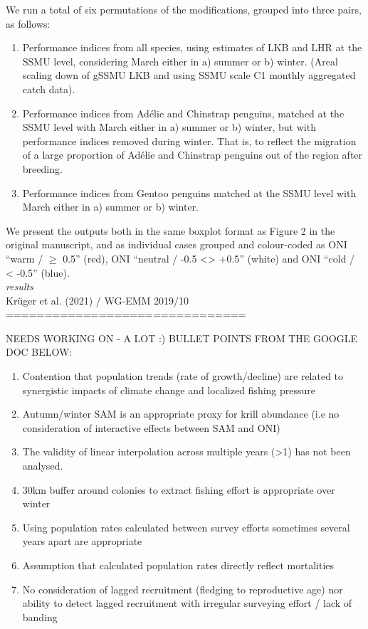 \documentclass[]{elsarticle} %
\providecommand{\tightlist}{%
  \setlength{\itemsep}{0pt}\setlength{\parskip}{0pt}}
\begin{document}
We run a total of six permutations of the modifications, grouped into
three pairs, as follows:

\begin{enumerate}
\def\labelenumi{\arabic{enumi}.}
\tightlist
\item
  Performance indices from all species, using estimates of LKB and LHR
  at the SSMU level, considering March either in a) summer or b) winter.
  (Areal scaling down of gSSMU LKB and using SSMU scale C1 monthly
  aggregated catch data).
\item
  Performance indices from Adélie and Chinstrap penguins, matched at the
  SSMU level with March either in a) summer or b) winter, but with
  performance indices removed during winter. That is, to reflect the
  migration of a large proportion of Adélie and Chinstrap penguins out
  of the region after breeding.
\item
  Performance indices from Gentoo penguins matched at the SSMU level
  with March either in a) summer or b) winter.
\end{enumerate}

We present the outputs both in the same boxplot format as Figure 2 in
the original manuscript, and as individual cases grouped and
colour-coded as ONI ``warm / \(\geqslant\) 0.5'' (red), ONI ``neutral /
-0.5 \textless\textgreater{} +0.5'' (white) and ONI ``cold / \textless{}
-0.5'' (blue).\\
\newline   \emph{results}\\
\newline Krüger et al. (2021) / WG-EMM 2019/10
===============================

NEEDS WORKING ON - A LOT :) BULLET POINTS FROM THE GOOGLE DOC BELOW:

\begin{enumerate}
\def\labelenumi{\arabic{enumi}.}
\tightlist
\item
  Contention that population trends (rate of growth/decline) are related
  to synergistic impacts of climate change and localized fishing
  pressure
\item
  Autumn/winter SAM is an appropriate proxy for krill abundance (i.e no
  consideration of interactive effects between SAM and ONI)
\item
  The validity of linear interpolation across multiple years
  (\textgreater1) has not been analysed.
\item
  30km buffer around colonies to extract fishing effort is appropriate
  over winter
\item
  Using population rates calculated between survey efforts sometimes
  several years apart are appropriate
\item
  Assumption that calculated population rates directly reflect
  mortalities
\item
  No consideration of lagged recruitment (fledging to reproductive age)
  nor ability to detect lagged recruitment with irregular surveying
  effort / lack of banding
\end{enumerate}
\end{document}
